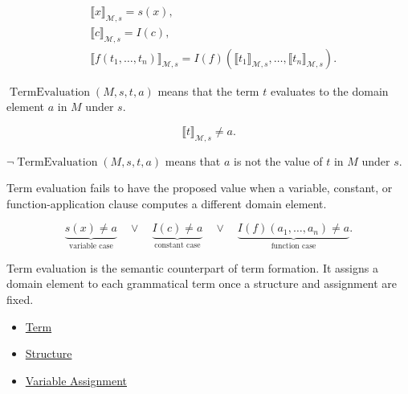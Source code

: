 \begin{remark*}
\[
\begin{aligned}
&\llbracket x\rrbracket_{\mathcal M,s}=s(x),\\
&\llbracket c\rrbracket_{\mathcal M,s}=I(c),\\
&\llbracket f(t_1,\ldots,t_n)\rrbracket_{\mathcal M,s}
=I(f)(\llbracket t_1\rrbracket_{\mathcal M,s},\ldots,
\llbracket t_n\rrbracket_{\mathcal M,s}).
\end{aligned}
\]
\end{remark*}

\begin{remark*}
\(\operatorname{TermEvaluation}(M,s,t,a)\) means that the term \(t\) evaluates
to the domain element \(a\) in \(M\) under \(s\).
\end{remark*}

\begin{remark*}
\[
\llbracket t\rrbracket_{\mathcal M,s}\neq a.
\]
\end{remark*}

\begin{remark*}
\(\neg\operatorname{TermEvaluation}(M,s,t,a)\) means that \(a\) is not the value
of \(t\) in \(M\) under \(s\).
\end{remark*}

\begin{remark*}
Term evaluation fails to have the proposed value when a variable, constant, or
function-application clause computes a different domain element.
\end{remark*}

\begin{remark*}
\[
\underbrace{s(x)\neq a}_{\text{variable case}}
\quad\lor\quad
\underbrace{I(c)\neq a}_{\text{constant case}}
\quad\lor\quad
\underbrace{I(f)(a_1,\ldots,a_n)\neq a}_{\text{function case}}.
\]
\end{remark*}

\begin{remark*}[Interpretation]
Term evaluation is the semantic counterpart of term formation. It assigns a
domain element to each grammatical term once a structure and assignment are
fixed.
\end{remark*}

\begin{dependencies}
\begin{itemize}
  \item \hyperref[def:term]{Term}
  \item \hyperref[def:structure]{Structure}
  \item \hyperref[def:var-assign]{Variable Assignment}
\end{itemize}
\end{dependencies}
